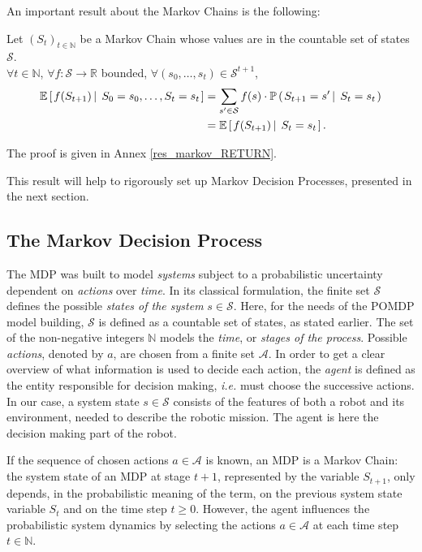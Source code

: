An important result about the Markov Chains is the following:
\begin{Property} \label{res_markov}
Let $(S_t)_{t \in \mathbb{N}}$ be a Markov Chain 
whose values are in the countable set of states $\mathcal{S}$.\\ 
$\forall t \in \mathbb{N}$, $\forall f: \mathcal{S} \rightarrow \mathbb{R}$ bounded, 
$\forall (s_0,\ldots,s_{t}) \in \mathcal{S}^{t+1}$,
\begin{align*}
\mathbb{E} \left[ \left.  f(S_{t+1}) \, \right| \left. \, S_0 = s_0, \ldots, S_t = s_t  \right. \right]  
&= \sum_{s' \in \mathcal{S}} f(s) \cdot \mathbb{P} \left( \left.  S_{t+1} = s' \, \right| \left. \, S_t = s_t  \right. \right) \\
&= \mathbb{E} \left[ \left.  f(S_{t+1}) \, \right| \left. \, S_t = s_t  \right. \right].
\end{align*}
\end{Property}
The proof is given in Annex \ref{res_markov_RETURN}.

This result will help to rigorously set up Markov Decision Processes,
presented in the next section.

\subsection{The Markov Decision Process}
\label{subsection_MDP}
The MDP \cite{puterman94}
was built to model \textit{systems} 
subject to a probabilistic uncertainty
dependent on \textit{actions} over \textit{time}.
In its classical formulation, the finite set $\mathcal{S}$
defines the possible \textit{states of the system} $s \in \mathcal{S}$.
Here, for the needs of the POMDP model building,
$\mathcal{S}$ is defined as a countable set of states, 
as stated earlier.
The set of the non-negative integers $\mathbb{N}$ 
models the \textit{time},
or \textit{stages of the process}.
Possible \textit{actions}, denoted by $a$, 
are chosen from a finite set $\mathcal{A}$.
In order to get a clear overview 
of what information is used 
to decide each action, 
the \textit{agent} is defined as
the entity responsible for decision making,
\textit{i.e.} must choose the successive actions.
In our case, a system state $s \in \mathcal{S}$ 
consists of the features of both a robot 
and its environment,
needed to describe the robotic mission.
The agent is here the decision making part of the robot.

If the sequence of chosen actions $a \in \mathcal{A}$
is known, an MDP is a Markov Chain:
the system state of an MDP at stage $t+1$,
represented by the variable $S_{t+1}$,
only depends, in the probabilistic meaning of the term,
on the previous system state variable $S_t$
and on the time step $t\geqslant 0$.
However, the agent influences the probabilistic system dynamics
by selecting the actions $a \in \mathcal{A}$ 
at each time step $t \in \mathbb{N}$.

